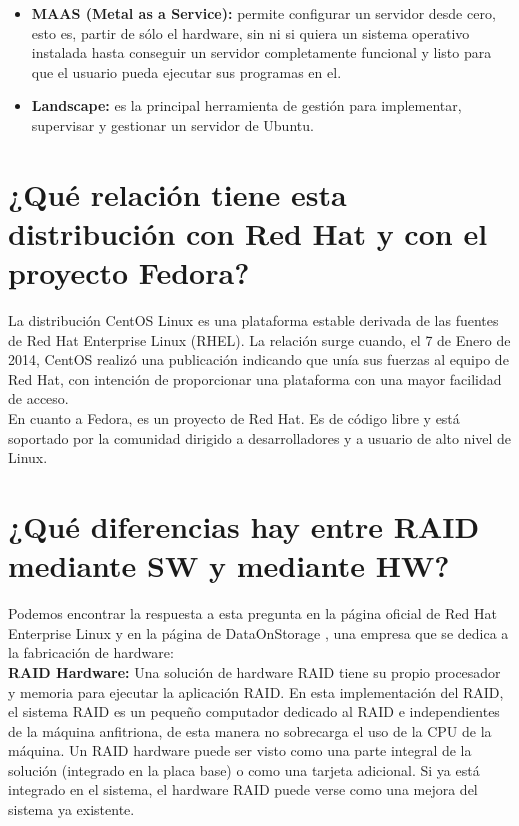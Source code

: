 \documentclass[a4paper,titlepage,12pt]{scrartcl}	%
\numberwithin{figure}{section} %
\numberwithin{table}{section} %
\begin{document}
	\begin{itemize}
		\item \textbf{MAAS (Metal as a Service):} permite configurar un servidor desde cero, esto es, partir de sólo el hardware, sin ni si quiera un sistema operativo instalada hasta conseguir un servidor completamente funcional y listo para que el usuario pueda ejecutar sus programas en el. \cite{MASSUbuntu} \cite{MASS}
		
		\item \textbf{Landscape:} es la principal herramienta de gestión para implementar, supervisar y gestionar un servidor de Ubuntu. \cite{Landscape}
	\end{itemize}
	
	\section[¿Qué relación tiene esta distribución con Red Hat y con el proyecto Fedora?]{¿Qué relación tiene esta distribución con Red Hat y con el proyecto Fedora?}
	
	La distribución CentOS Linux es una plataforma estable derivada de las fuentes de Red Hat Enterprise Linux (RHEL). \cite{CentOS} La relación surge cuando, el 7 de Enero de 2014, CentOS realizó una publicación indicando que unía sus fuerzas al equipo de Red Hat, con intención de proporcionar una plataforma con una mayor facilidad de acceso. \cite{CentOSFedora} \\
	En cuanto a Fedora, es un proyecto de Red Hat. Es de código libre y está soportado por la comunidad dirigido a desarrolladores y a usuario de alto nivel de Linux. \cite{RHFedora}
	
	\section[¿Qué diferencias hay entre RAID mediante SW y mediante HW?]{¿Qué diferencias hay entre RAID mediante SW y mediante HW?}
	
	Podemos encontrar la respuesta a esta pregunta en la página oficial de Red Hat Enterprise Linux \cite{RAIDSWHW} y en la página de DataOnStorage \cite{RAIDSWHW2}, una empresa que se dedica a la fabricación de hardware: \\
	
	\textbf{RAID Hardware:} Una solución de hardware RAID tiene su propio procesador y memoria para ejecutar la aplicación RAID. En esta implementación del RAID, el sistema RAID es un pequeño computador dedicado al RAID e independientes de la máquina anfitriona, de esta manera no sobrecarga el uso de la CPU de la máquina.
	Un RAID hardware puede ser visto como una parte integral de la solución (integrado en la placa base) o como una tarjeta adicional. Si ya está integrado en el sistema, el hardware RAID puede verse como una mejora del sistema ya existente. \\	
	
\end{document}
